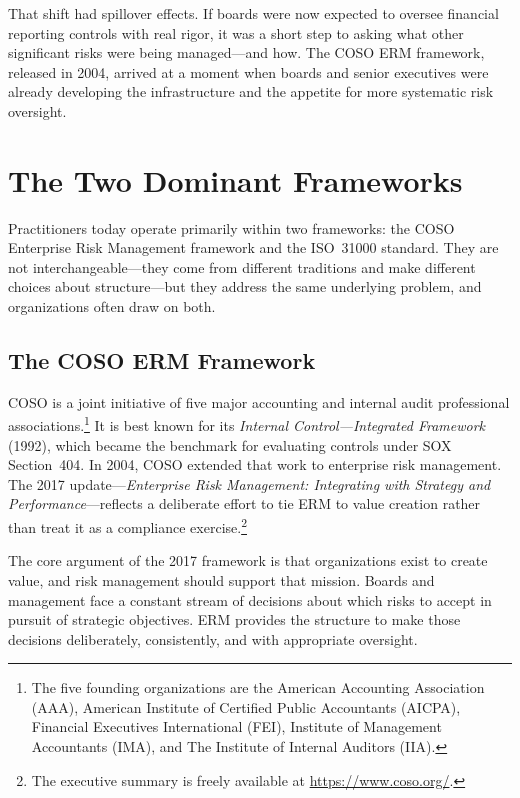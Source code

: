 \documentclass[11pt,openany]{book}
\begin{document}
That shift had spillover effects. If boards were now expected to oversee financial reporting controls with real rigor, it was a short step to asking what other significant risks were being managed---and how. The COSO ERM framework, released in 2004, arrived at a moment when boards and senior executives were already developing the infrastructure and the appetite for more systematic risk oversight.


\section{The Two Dominant Frameworks}
\label{sec:frameworks}

Practitioners today operate primarily within two frameworks: the COSO Enterprise Risk Management framework and the ISO~31000 standard. They are not interchangeable---they come from different traditions and make different choices about structure---but they address the same underlying problem, and organizations often draw on both.

\subsection{The COSO ERM Framework}
\label{subsec:coso}

COSO is a joint initiative of five major accounting and internal audit professional associations.\footnote{The five founding organizations are the American Accounting Association (AAA), American Institute of Certified Public Accountants (AICPA), Financial Executives International (FEI), Institute of Management Accountants (IMA), and The Institute of Internal Auditors (IIA).} It is best known for its \emph{Internal Control---Integrated Framework} (1992), which became the benchmark for evaluating controls under SOX Section~404. In 2004, COSO extended that work to enterprise risk management. The 2017 update---\emph{Enterprise Risk Management: Integrating with Strategy and Performance}---reflects a deliberate effort to tie ERM to value creation rather than treat it as a compliance exercise.\footnote{The executive summary is freely available at \url{https://www.coso.org/}.}

The core argument of the 2017 framework is that organizations exist to create value, and risk management should support that mission. Boards and management face a constant stream of decisions about which risks to accept in pursuit of strategic objectives. ERM provides the structure to make those decisions deliberately, consistently, and with appropriate oversight.
\end{document}
